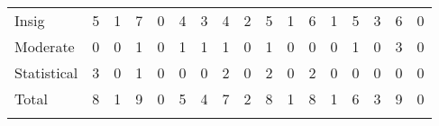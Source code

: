 \begin{tabular}{lcccccccccccccccc}
\hline \noalign{\smallskip}Insig & 5 & 1 & 7 & 0 & 4 & 3 & 4 & 2 & 5 & 1 & 6 & 1 & 5 & 3 & 6 & 0\\
Moderate & 0 & 0 & 1 & 0 & 1 & 1 & 1 & 0 & 1 & 0 & 0 & 0 & 1 & 0 & 3 & 0\\
Statistical & 3 & 0 & 1 & 0 & 0 & 0 & 2 & 0 & 2 & 0 & 2 & 0 & 0 & 0 & 0 & 0\\
Total & 8 & 1 & 9 & 0 & 5 & 4 & 7 & 2 & 8 & 1 & 8 & 1 & 6 & 3 & 9 & 0\\
\noalign{\smallskip}\hline\end{tabular}\\
